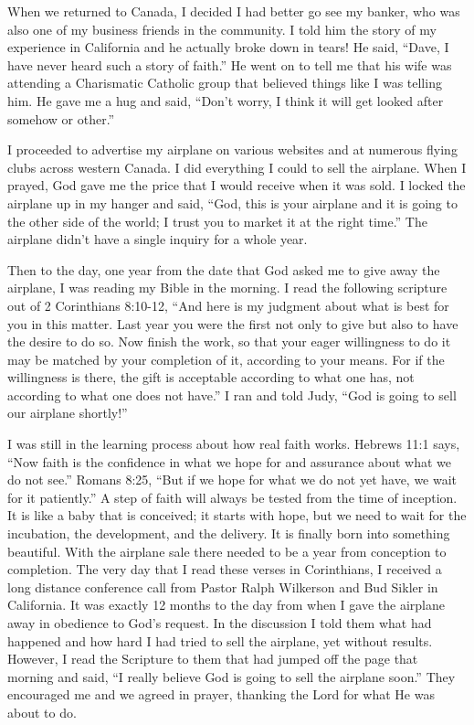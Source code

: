 \documentclass[twoside, 12pt]{book}
\begin{document}
When we returned to Canada, I decided I had better go see my banker, who was also one of my business friends in the community. I told him the story of my experience in California and he actually broke down in tears! He said, “Dave, I have never heard such a story of faith.” He went on to tell me that his wife was attending a Charismatic Catholic group that believed things like I was telling him. He gave me a hug and said, “Don't worry, I think it will get looked after somehow or other.”

I proceeded to advertise my airplane on various websites and at numerous flying clubs across western Canada. I did everything I could to sell the airplane. When I prayed, God gave me the price that I would receive when it was sold. I locked the airplane up in my hanger and said, “God, this is your airplane and it is going to the other side of the world; I trust you to market it at the right time.” The airplane didn't have a single inquiry for a whole year. 

Then to the day, one year from the date that God asked me to give away the airplane, I was reading my Bible in the morning. I read the following scripture out of 2 Corinthians 8:10-12, “And here is my judgment about what is best for you in this matter. Last year you were the first not only to give but also to have the desire to do so. Now finish the work, so that your eager willingness to do it may be matched by your completion of it, according to your means. For if the willingness is there, the gift is acceptable according to what one has, not according to what one does not have.” I ran and told Judy, “God is going to sell our airplane shortly!” 

I was still in the learning process about how real faith works. Hebrews 11:1 says, “Now faith is the confidence in what we hope for and assurance about what we do not see.” Romans 8:25, “But if we hope for what we do not yet have, we wait for it patiently.” A step of faith will always be tested from the time of inception. It is like a baby that is conceived; it starts with hope, but we need to wait for the incubation, the development, and the delivery. It is finally born into something beautiful. With the airplane sale there needed to be a year from conception to completion. The very day that I read these verses in Corinthians, I received a long distance conference call from Pastor Ralph Wilkerson and Bud Sikler in California. It was exactly 12 months to the day from when I gave the airplane away in obedience to God's request. In the discussion I told them what had happened and how hard I had tried to sell the airplane, yet without results. However, I read the Scripture to them that had jumped off the page that morning and said, “I really believe God is going to sell the airplane soon.” They encouraged me and we agreed in prayer, thanking the Lord for what He was about to do.
\end{document}
